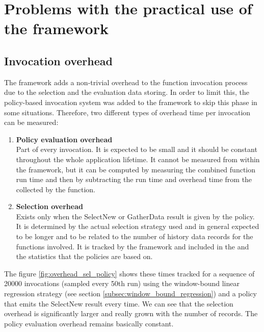 \section{Problems with the practical use of the framework}

\subsection{Invocation overhead}

The framework adds a non-trivial overhead to the function invocation process due to the selection and the evaluation data storing. In order to limit this, the policy-based invocation system was added to the framework to skip this phase in some situations. Therefore, two different types of overhead time per invocation can be measured:

\begin{enumerate}
	\item \textbf{Policy evaluation overhead}\\
	Part of every invocation. It is expected to be small and it should be constant throughout the whole application lifetime. It cannot be measured from within the framework, but it can be computed by measuring the combined function run time and then by subtracting the run time and overhead time from the  collected by the function.
	\item \textbf{Selection overhead}\\
	Exists only when the SelectNew or GatherData result is given by the policy. It is determined by the actual selection strategy used and in general expected to be longer and to be related to the number of history data records for the functions involved. It is tracked by the framework and included in the  and the statistics that the policies are based on.
\end{enumerate}

The figure \ref{fig:overhead_sel_policy} shows these times tracked for a sequence of 20000 invocations (sampled every 50th run) using the window-bound linear regression strategy (see section \ref{subsec:window_bound_regression}) and a policy that emits the SelectNew result every time. We can see that the selection overhead is significantly larger and really grown with the number of records. The policy evaluation overhead remains basically constant.

